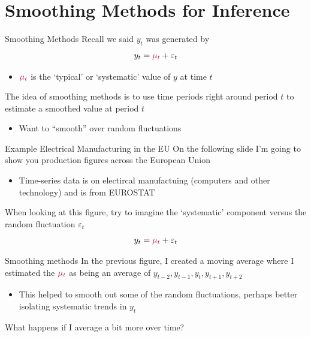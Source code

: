 \documentclass[aspectratio=169,t,11pt,table]{beamer}
\begin{document}
\section{Smoothing Methods for Inference}

\begin{frame}{Smoothing Methods}
  Recall we said $y_t$ was generated by 
  $$
    y_t = {\color[HTML]{B3114B} \mu_t} + \varepsilon_t
  $$
  \begin{itemize}
    \item ${\color[HTML]{B3114B} \mu_t}$ is the `typical' or `systematic' value of $y$ at time $t$
  \end{itemize}

  \bigskip
  The idea of \alert{smoothing methods} is to use time periods right around period $t$ to estimate a smoothed value at period $t$
  \begin{itemize}
    \item Want to ``smooth'' over random fluctuations 
  \end{itemize}
\end{frame}

\begin{frame}{Example Electrical Manufacturing in the EU}
  On the following slide I'm going to show you production figures across the European Union
  \begin{itemize}
    \item Time-series data is on electircal manufactuing (computers and other technology) and is from EUROSTAT 
  \end{itemize}

  \bigskip
  When looking at this figure, try to imagine the `systematic' component versus the random fluctuation $\varepsilon_t$
  $$
    y_t = {\color[HTML]{B3114B} \mu_t} + \varepsilon_t
  $$
\end{frame}


\begin{frame}{Smoothing methods}
  In the previous figure, I created a \alert{moving average} where I estimated the ${\color[HTML]{B3114B} \mu_t}$ as being an average of $y_{t-2}, y_{t-1}, y_{t}, y_{t+1}, y_{t+2}$

  \begin{itemize}
    \item This helped to smooth out some of the random fluctuations, perhaps better isolating systematic trends in $y_t$
  \end{itemize}

  \bigskip
  \pause
  What happens if I average a bit more over time?
\end{frame}
\end{document}
